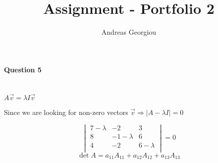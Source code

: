 \documentclass[10pt,a4paper]{report}
\author{Andreas Georgiou}
\title{Assignment - Portfolio 2}
\begin{document}
\maketitle
\paragraph*{Question 5} ~\\

$A\vec{v} = \lambda I\vec{v} $

Since we are looking for non-zero vectors 
$\vec{v} \Rightarrow \vert A-\lambda I\vert = 0$

\[
\begin{vmatrix}
7-\lambda & -2 & 3 \\
8 & -1-\lambda & 6 \\
4 & -2 & 6-\lambda \\
\end{vmatrix} = 0
\]
\[
\det A = a_{11}A_{11} + a_{12}A_{12} + a_{13}A_{13}
\]
\end{document}
